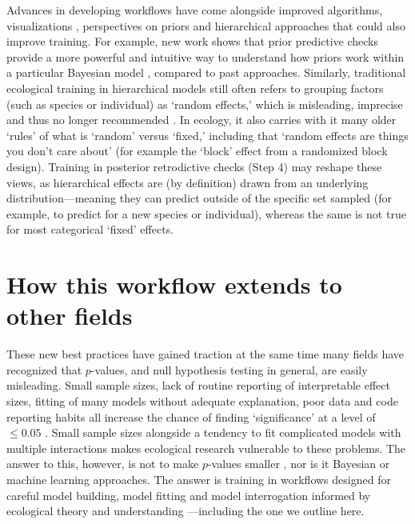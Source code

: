 \documentclass[11pt]{article}
\begin{document}
Advances in developing workflows have come alongside improved algorithms, visualizations \citep[e.g.][]{betanworkflow,vandeschoot2021,gabryvis}, perspectives on priors \citep{BDA,regotherstories,betanprior}  and hierarchical approaches that could also improve training. %
For example, new work shows that prior predictive checks provide a more powerful and intuitive way to understand how priors work within a particular Bayesian model \citep{betanprior}, compared to past approaches. Similarly, traditional ecological training in hierarchical models still often refers to grouping factors (such as species or individual) as `random effects,' which is misleading, imprecise and thus no longer recommended \citep{gelmanhill}. In ecology, it also carries with it many older `rules' of what is `random' versus `fixed,' including that `random effects are things you don't care about' (for example the `block' effect from a randomized block design). Training in posterior retrodictive checks (Step 4) may reshape these views, as hierarchical effects are (by definition) drawn from an underlying distribution---meaning they can predict outside of the specific set  sampled (for example, to predict for a new species or individual), whereas the same is not true for most categorical `fixed' effects.

\section*{How this workflow extends to other fields} 

These new best practices have gained traction at the same time many fields have recognized that $p$-values, and null hypothesis testing in general, are easily misleading. Small sample sizes, lack of routine reporting of interpretable effect sizes, fitting of many models without adequate explanation, poor data and code reporting habits all increase the chance of finding `significance' at a level of $\le0.05$ \citep{halsey2015,loken2017}. Small sample sizes alongside a tendency to fit complicated models with multiple interactions makes ecological research vulnerable to these problems. The answer to this, however, is not to make $p$-values smaller \citep{halsey2015,colquhoun2017}, nor is it Bayesian or machine learning approaches. %
The answer is training in workflows designed for careful model building, model fitting and model interrogation informed by ecological theory and understanding \citep{hilborn2013ecological}---including the one we outline here. 
\end{document}
